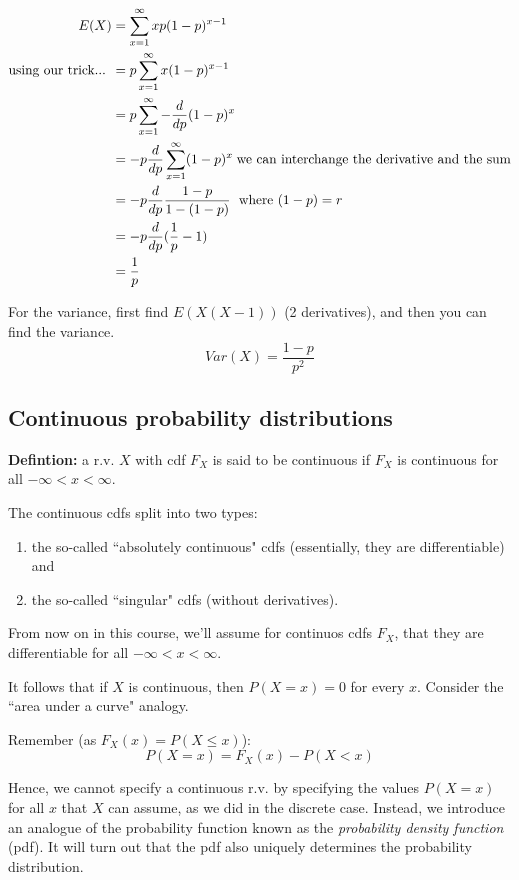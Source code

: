 \documentclass[12pt]{article}
\begin{document}
\begin{align*}
    E(X) &= \sum_{x=1}^{\infty} x p (1-p)^{x-1} \\
    \textnormal{using our trick... }   &=  p \sum_{x=1}^{\infty} x (1-p)^{x-1} \\
        &= p \sum_{x=1}^{\infty} - \frac{d}{dp} (1-p)^{x} \\
        &= -p \frac{d}{dp} \sum_{x=1}^{\infty} (1-p)^{x} \; \textnormal{we can interchange the derivative and the sum} \\
        &= -p \frac{d}{dp} \frac{1-p}{1-(1-p)} \; \textnormal{ where } (1-p) = r \\
        &= -p \frac{d}{dp} (\frac{1}{p} - 1) \\
        &= \frac{1}{p}
\end{align*}

For the variance, first find $E(X(X-1))$ (2 derivatives), and then you can find the variance.
\[
    Var(X) = \frac{1-p}{p^2}
\]

\subsection{Continuous probability distributions}
\textbf{Defintion:} a r.v. $X$ with cdf $F_X$ is said to be continuous if $F_X$ is continuous for all $- \infty < x < \infty$.

The continuous cdfs split into two types:
\begin{enumerate}
    \item the so-called ``absolutely continuous" cdfs (essentially, they are differentiable) and
    \item the so-called ``singular" cdfs (without derivatives).
\end{enumerate}

From now on in this course, we'll assume for continuos cdfs $F_X$, that they are differentiable for all $- \infty < x < \infty$.

It follows that if $X$ is continuous, then $P(X=x)=0$ for every $x$. Consider the ``area under a curve" analogy.

Remember (as $F_X (x) = P(X \leq x)$):
\[
    P(X=x) = F_X (x) - P(X < x)
\]

Hence, we cannot specify a continuous r.v. by specifying the values $P(X=x)$ for all $x$ that $X$ can assume, as we did in the discrete case. Instead, we introduce an analogue of the probability function known as the \emph{probability density function} (pdf). It will turn out that the pdf also uniquely determines the probability distribution.
\end{document}
